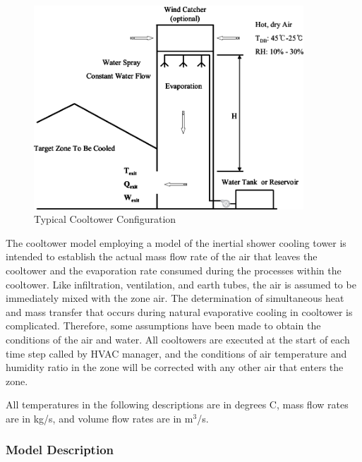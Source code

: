 \begin{figure}[hbtp] %
\centering
\includegraphics[width=0.9\textwidth, height=0.9\textheight, keepaspectratio=true]{media/image7400.svg.png}
\caption{Typical Cooltower Configuration \protect \label{fig:typical-cooltower-configuration}}
\end{figure}

The cooltower model employing a model of the inertial shower cooling tower is intended to establish the actual mass flow rate of the air that leaves the cooltower and the evaporation rate consumed during the processes within the cooltower. Like infiltration, ventilation, and earth tubes, the air is assumed to be immediately mixed with the zone air. The determination of simultaneous heat and mass transfer that occurs during natural evaporative cooling in cooltower is complicated. Therefore, some assumptions have been made to obtain the conditions of the air and water. All cooltowers are executed at the start of each time step called by HVAC manager, and the conditions of air temperature and humidity ratio in the zone will be corrected with any other air that enters the zone.

All temperatures in the following descriptions are in degrees C, mass flow rates are in kg/s, and volume flow rates are in m\(^{3}\)/s.

\subsubsection{Model Description}\label{model-description-5-000}

